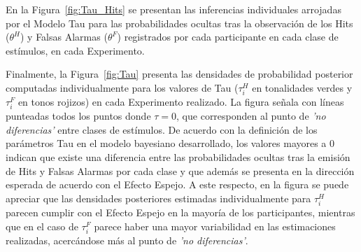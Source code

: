 En la Figura~\ref{fig:Tau_Hits} se presentan las inferencias individuales arrojadas por el Modelo Tau para las probabilidades ocultas tras la observación de los Hits ($\theta^H$) y Falsas Alarmas ($\theta^F$) registrados por cada participante en cada clase de estímulos, en cada Experimento. \\

\decoRule

Finalmente, la Figura~\ref{fig:Tau} presenta las densidades de probabilidad posterior computadas individualmente para los valores de Tau ($\tau^H_{i}$ en tonalidades verdes y $\tau^F_{i}$ en tonos rojizos) en cada Experimento realizado. La figura señala con líneas punteadas todos los puntos donde $\tau = 0$, que corresponden al punto de \textit{'no diferencias'} entre clases de estímulos. De acuerdo con la definición de los parámetros Tau en el modelo bayesiano desarrollado, los valores mayores a 0 indican que existe una diferencia entre las probabilidades ocultas tras la emisión de Hits y Falsas Alarmas por cada clase y que además se presenta en la dirección esperada de acuerdo con el Efecto Espejo. A este respecto, en la figura se puede apreciar que las densidades posteriores estimadas individualmente para $\tau^H_{i}$ parecen cumplir con el Efecto Espejo en la mayoría de los participantes, mientras que en el caso de $\tau^F_{i}$ parece haber una mayor variabilidad en las estimaciones realizadas, acercándose más al punto de \textit{'no diferencias'}.\\

